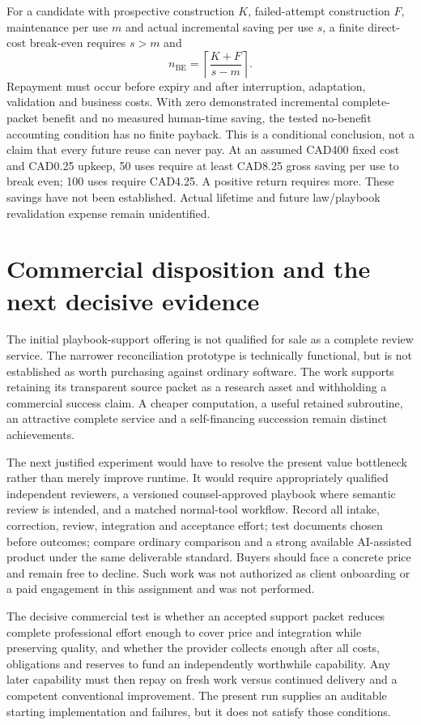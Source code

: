 \documentclass[10pt,a4paper]{article}
\begin{document}
For a candidate with prospective construction $K$, failed-attempt construction $F$, maintenance per use $m$ and actual incremental saving per use $s$, a finite direct-cost break-even requires $s>m$ and
\[
n_{\mathrm{BE}}=\left\lceil\frac{K+F}{s-m}\right\rceil.
\]
Repayment must occur before expiry and after interruption, adaptation, validation and business costs. With zero demonstrated incremental complete-packet benefit and no measured human-time saving, the tested no-benefit accounting condition has no finite payback. This is a conditional conclusion, not a claim that every future reuse can never pay. At an assumed CAD400 fixed cost and CAD0.25 upkeep, 50 uses require at least CAD8.25 gross saving per use to break even; 100 uses require CAD4.25. A positive return requires more. These savings have not been established. Actual lifetime and future law/playbook revalidation expense remain unidentified.

\section{Commercial disposition and the next decisive evidence}
The initial playbook-support offering is not qualified for sale as a complete review service. The narrower reconciliation prototype is technically functional, but is not established as worth purchasing against ordinary software. The work supports retaining its transparent source packet as a research asset and withholding a commercial success claim. A cheaper computation, a useful retained subroutine, an attractive complete service and a self-financing succession remain distinct achievements.

The next justified experiment would have to resolve the present value bottleneck rather than merely improve runtime. It would require appropriately qualified independent reviewers, a versioned counsel-approved playbook where semantic review is intended, and a matched normal-tool workflow. Record all intake, correction, review, integration and acceptance effort; test documents chosen before outcomes; compare ordinary comparison and a strong available AI-assisted product under the same deliverable standard. Buyers should face a concrete price and remain free to decline. Such work was not authorized as client onboarding or a paid engagement in this assignment and was not performed.

The decisive commercial test is whether an accepted support packet reduces complete professional effort enough to cover price and integration while preserving quality, and whether the provider collects enough after all costs, obligations and reserves to fund an independently worthwhile capability. Any later capability must then repay on fresh work versus continued delivery and a competent conventional improvement. The present run supplies an auditable starting implementation and failures, but it does not satisfy those conditions.
\end{document}

